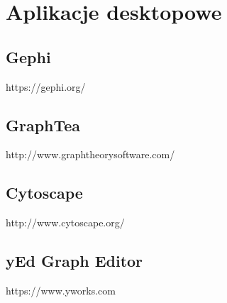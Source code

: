 \section{Aplikacje desktopowe}

\subsection*{Gephi}
https://gephi.org/

\subsection*{GraphTea}
http://www.graphtheorysoftware.com/

\subsection*{Cytoscape}
http://www.cytoscape.org/

\subsection*{yEd Graph Editor}
https://www.yworks.com
